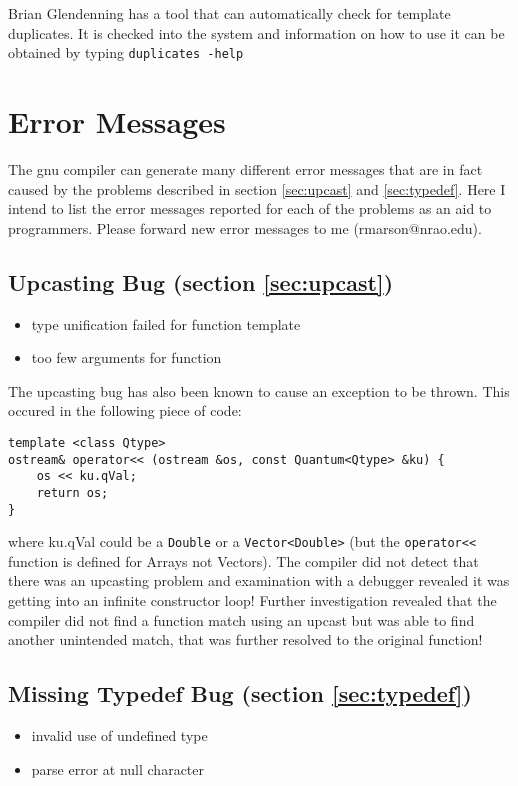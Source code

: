 Brian Glendenning has a tool that can automatically check for template
duplicates. It is checked into the system and information on how to use it
can be obtained by typing \texttt{duplicates -help}

\section{Error Messages\label{sec:error-messages}}
The gnu compiler can generate many different error messages that are in
fact caused by the problems described in section \ref{sec:upcast} and
\ref{sec:typedef}. Here I intend to list the error messages reported for
each of the problems as an aid to programmers. Please forward new error
messages to me (rmarson@nrao.edu).

\subsection{Upcasting Bug (section \ref{sec:upcast})}
\begin{itemize}
  \item type unification failed for function template
  \item too few arguments for function
\end{itemize}

The upcasting bug has also been known to cause an exception to be
thrown. This occured in the following piece of code:
\begin{verbatim}
template <class Qtype>
ostream& operator<< (ostream &os, const Quantum<Qtype> &ku) {
    os << ku.qVal;
    return os;
}
\end{verbatim}
where ku.qVal could be a \texttt{Double} or a \texttt{Vector<Double>} (but
the \texttt{operator<<} function is defined for Arrays not Vectors). The
compiler did not detect that there was an upcasting problem and examination
with a debugger revealed it was getting into an infinite constructor loop!
Further investigation revealed that the compiler did not find a
function match using an upcast but was able to find another unintended
match, that was further resolved to the original function!

\subsection{Missing Typedef Bug (section \ref{sec:typedef})}
\begin{itemize}
  \item invalid use of undefined type  
  \item parse error at null character
\end{itemize}


